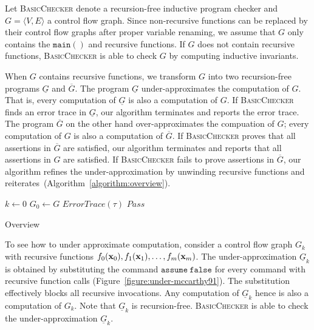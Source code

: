 
Let \textsc{BasicChecker} denote a recursion-free inductive program
checker and $G = \langle V, E \rangle$ a control flow graph. Since
non-recursive functions can be replaced by their control flow graphs
after proper variable renaming, we assume that $G$ only contains the
$\mathtt{main()}$ and recursive functions. If $G$ does not contain
recursive functions, \textsc{BasicChecker} is able to check $G$ by
computing inductive invariants.

When $G$ contains recursive functions, we transform $G$ into two
recursion-free programs $\underline{G}$ and $\overline{G}$. The
program $\underline{G}$ under-approximates the computation of
$G$. That is, every computation of $\underline{G}$ is also a
computation of $G$. If \textsc{BasicChecker} finds an error trace in
$\underline{G}$, our algorithm terminates and reports the error
trace. The program $\overline{G}$ on the other hand over-approximates
the compuation of $G$; every computation of $G$ is also a computation
of $\overline{G}$. If \textsc{BasicChecker} proves
that all assertions in $\overline{G}$ are satisfied, our algorithm
terminates and reports that all assertions in $G$ are satisfied. If
\textsc{BasicChecker} fails to prove assertions in $\overline{G}$, our
algorithm refines the under-approximation by unwinding recursive functions
and reiterates~(Algorithm~\ref{algorithm:overview}). 

\begin{algorithm}
  $k \leftarrow 0$\;
  $G_0 \leftarrow G$\;
  {
    {
      \Return $\mathit{ErrorTrace} (\tau)$\;
    }
    {
      \Return $\mathit{Pass}$\;
    }
  }
  \caption{Overview}
  \label{algorithm:overview}
\end{algorithm}

To see how to under approximate computation, consider a control flow
graph $G_k$ with recursive functions $f_0 (\textbf{x}_0), f_1 (\textbf{x}_1),
\ldots, f_m (\textbf{x}_m)$. The under-approximation $\underline{G}_k$ is
obtained by substituting the command $\mathtt{assume\ false}$ for
every command with recursive function calls
(Figure~\ref{figure:under-mccarthy91}). The substitution
effectively blocks all recursive invocations. Any computation of
$\underline{G}_k$ hence is also a computation of $G_k$. Note that
$\underline{G}_k$ is recursion-free. \textsc{BasicChecker} is able to
check the under-approximation $\underline{G}_k$.


